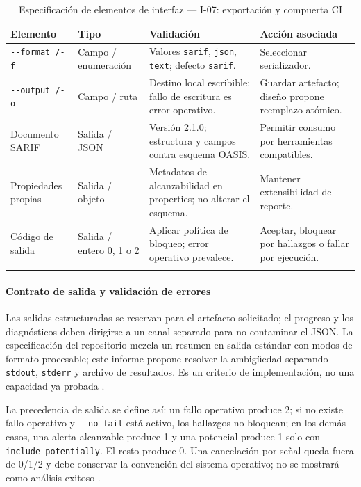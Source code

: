 \begin{table}[H]
\centering\small{}
\caption{Especificación de elementos de interfaz --- I-07: exportación y compuerta CI}
\begin{tabularx}{\textwidth}{P{3.0cm}P{2.3cm}YY}
\toprule
\textbf{Elemento} & \textbf{Tipo} & \textbf{Validación} & \textbf{Acción asociada} \\
\midrule
\texttt{-\allowbreak -\allowbreak format /\allowbreak  -\allowbreak f} & Campo / enumeración & Valores \texttt{sarif}, \texttt{json}, \texttt{text}; defecto \texttt{sarif}. & Seleccionar serializador. \\
\addlinespace
\texttt{-\allowbreak -\allowbreak output /\allowbreak  -\allowbreak o} & Campo / ruta & Destino local escribible; fallo de escritura es error operativo. & Guardar artefacto; diseño propone reemplazo atómico. \\
\addlinespace
Documento SARIF & Salida / JSON & Versión 2.1.0; estructura y campos contra esquema OASIS. & Permitir consumo por herramientas compatibles. \\
\addlinespace
Propiedades propias & Salida / objeto & Metadatos de alcanzabilidad en properties; no alterar el esquema. & Mantener extensibilidad del reporte. \\
\addlinespace
Código de salida & Salida / entero 0, 1 o 2 & Aplicar política de bloqueo; error operativo prevalece. & Aceptar, bloquear por hallazgos o fallar por ejecución. \\
\addlinespace
\bottomrule
\end{tabularx}
\end{table}


\paragraph*{Contrato de salida y validación de errores}
Las salidas estructuradas se reservan para el artefacto solicitado; el progreso y los diagnósticos deben dirigirse a un canal separado para no contaminar el JSON. La especificación del repositorio mezcla un resumen en salida estándar con modos de formato procesable; este informe propone resolver la ambigüedad separando \texttt{stdout}, \texttt{stderr} y archivo de resultados. Es un criterio de implementación, no una capacidad ya probada \parencite{pyreach2026repo,oasis2019sarif}.

La precedencia de salida se define así: un fallo operativo produce 2; si no existe fallo operativo y \texttt{-\allowbreak -\allowbreak no-\allowbreak fail} está activo, los hallazgos no bloquean; en los demás casos, una alerta alcanzable produce 1 y una potencial produce 1 solo con \texttt{-\allowbreak -\allowbreak include-\allowbreak potentially}. El resto produce 0. Una cancelación por señal queda fuera de 0/1/2 y debe conservar la convención del sistema operativo; no se mostrará como análisis exitoso \parencite{humble2010continuous}.


